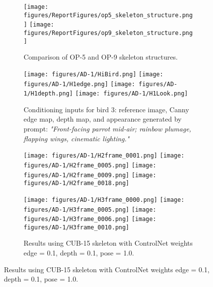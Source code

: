 \documentclass[final-report]{report-template}
\begin{document}
\begin{figure}[htbp]
  \centering

  \begin{subfigure}[t]{0.7\textwidth}
    \centering
    \texttt{[image: figures/ReportFigures/op5\_skeleton\_structure.png]}\hfill
    \texttt{[image: figures/ReportFigures/op9\_skeleton\_structure.png]}
    \caption{Comparison of OP-5 and OP-9 skeleton structures.}
    \label{fig:op5-op9}
  \end{subfigure}

  \vspace{1em}

  \begin{subfigure}[t]{\textwidth}
    \centering
    \texttt{[image: figures/AD-1/HiBird.png]}
    \texttt{[image: figures/AD-1/H1edge.png]}
    \texttt{[image: figures/AD-1/H1depth.png]}
    \texttt{[image: figures/AD-1/H1Look.png]}
    \caption{Conditioning inputs for bird 3: reference image, Canny edge map, depth map, and appearance generated by prompt: \textit{"Front-facing parrot mid-air; rainbow plumage, flapping wings, cinematic lighting."}}
    \label{bird3}
  \end{subfigure}

  \begin{subfigure}[t]{\textwidth}
    \centering
    \texttt{[image: figures/AD-1/H2frame\_0001.png]}
    \texttt{[image: figures/AD-1/H2frame\_0005.png]}
    \texttt{[image: figures/AD-1/H2frame\_0009.png]}
    \texttt{[image: figures/AD-1/H2frame\_0018.png]}
  \end{subfigure}

  \begin{subfigure}[t]{\textwidth}
    \centering
    \texttt{[image: figures/AD-1/H3frame\_0000.png]}
    \texttt{[image: figures/AD-1/H3frame\_0005.png]}
    \texttt{[image: figures/AD-1/H3frame\_0006.png]}
    \texttt{[image: figures/AD-1/H3frame\_0010.png]}
    \caption{Results using CUB-15 skeleton with ControlNet weights edge = 0.1, depth = 0.1, pose = 1.0.}
    \label{bird3cub}
  \end{subfigure}


\end{figure}
\end{document}
